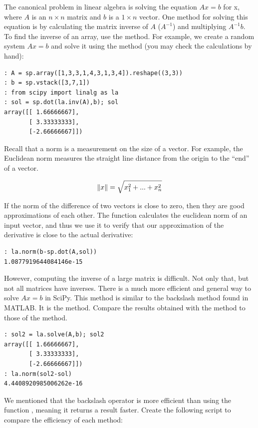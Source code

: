 The canonical problem in linear algebra is solving the equation $Ax = b$ for x,
where $A$ is an $n \times n$ matrix and $b$ is a  $1 \times n$ vector.  One method for solving this equation is by calculating the matrix inverse of $A$ ($A^{-1}$) and multiplying $A^{-1}b$.  To find the inverse of an array, use the  method.
For example, we create a random system $Ax =b$ and solve it using the  method (you may check the calculations by hand):

\begin{lstlisting}
: A = sp.array([1,3,3,1,4,3,1,3,4]).reshape((3,3))
: b = sp.vstack([3,7,1])
: from scipy import linalg as la
: sol = sp.dot(la.inv(A),b); sol
array([[ 1.66666667],
       [ 3.33333333],
       [-2.66666667]])
\end{lstlisting}

Recall that a norm is a measurement on the size of a vector.  For example, the
Euclidean norm measures the straight line distance from the origin to the
``end'' of a vector.

\[
\lVert x\rVert = \sqrt{x_1^2 + ... + x_n^2}
\]

If the norm of the difference of two vectors is close to zero, then they are
good approximations of each other.  The  function calculates the
euclidean norm of an input vector, and thus we use it to verify that our
approximation of the derivative is close to the actual derivative:
\begin{lstlisting}
: la.norm(b-sp.dot(A,sol))
1.0877919644084146e-15
\end{lstlisting}

However, computing the inverse of a large matrix is difficult.  Not only that, but not all matrices have inverses.  There is a much more efficient and general way to solve $Ax=b$ in SciPy.  This method is similar to the backslash method found in MATLAB.  It is the  method. Compare the results obtained with the  method to those of the  method.
\begin{lstlisting}
: sol2 = la.solve(A,b); sol2
array([[ 1.66666667],
       [ 3.33333333],
       [-2.66666667]])
: la.norm(sol2-sol)
4.4408920985006262e-16
\end{lstlisting}

We mentioned that the backslash operator is more efficient than using the
function , meaning it returns a result faster. Create the following script to compare the efficiency of each method:

